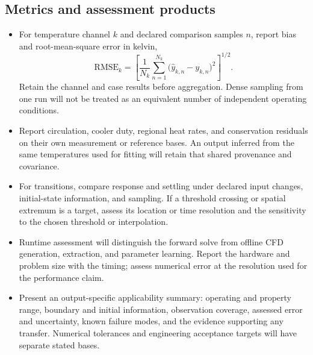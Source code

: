 \subsection{Metrics and assessment products}\label{subsec:metrics-and-assessment-products}
\begin{itemize}[leftmargin=*]
\item For temperature channel $k$ and declared comparison samples $n$, report bias and root-mean-square error in kelvin,
\begin{equation}
\mathrm{RMSE}_k=\left[\frac{1}{N_k}\sum_{n=1}^{N_k}
\bigl(\widehat y_{k,n}-y_{k,n}\bigr)^2\right]^{1/2}.
\label{eq:temperature-rmse}
\end{equation}
Retain the channel and case results before aggregation. Dense sampling from one run will not be treated as an equivalent number of independent operating conditions.
\item Report circulation, cooler duty, regional heat rates, and conservation residuals on their own measurement or reference bases. An output inferred from the same temperatures used for fitting will retain that shared provenance and covariance.
\item For transitions, compare response and settling under declared input changes, initial-state information, and sampling. If a threshold crossing or spatial extremum is a target, assess its location or time resolution and the sensitivity to the chosen threshold or interpolation.
\item Runtime assessment will distinguish the forward solve from offline CFD generation, extraction, and parameter learning. Report the hardware and problem size with the timing; assess numerical error at the resolution used for the performance claim.
\item Present an output-specific applicability summary: operating and property range, boundary and initial information, observation coverage, assessed error and uncertainty, known failure modes, and the evidence supporting any transfer. Numerical tolerances and engineering acceptance targets will have separate stated bases.
\end{itemize}

